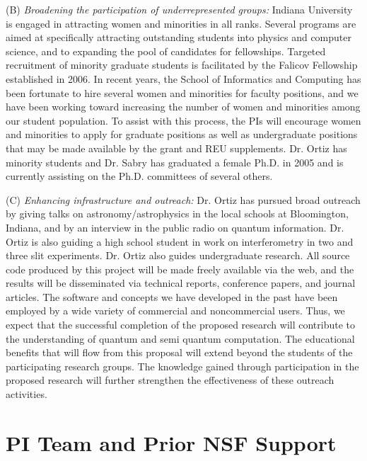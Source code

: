\documentclass{article}
\theoremstyle{remark}
\begin{document}
\medskip
\noindent (B) {\em Broadening the participation of underrepresented groups:}
Indiana University is engaged in attracting women and minorities in all
ranks. Several programs are aimed at specifically attracting outstanding
students into physics and computer science, and to expanding the pool of
candidates for fellowships. Targeted recruitment of minority graduate
students is facilitated by the Falicov Fellowship established in 2006. In
recent years, the School of Informatics and Computing has been fortunate to
hire several women and minorities for faculty positions, and we have been
working toward increasing the number of women and minorities among our
student population. To assist with this process, the PIs will encourage women
and minorities to apply for graduate positions as well as undergraduate
positions that may be made available by the grant and REU
supplements. Dr. Ortiz has minority students and Dr. Sabry has graduated a
female Ph.D. in 2005 and is currently assisting on the Ph.D. committees of
several others. 

\medskip
\noindent (C) {\em Enhancing infrastructure and outreach:} Dr. Ortiz
has pursued broad outreach by giving talks on astronomy/astrophysics
in the local schools at Bloomington, Indiana, and by an interview in
the public radio on quantum information. Dr. Ortiz is also guiding a
high school student in work on interferometry in two and three slit
experiments. Dr. Ortiz also guides undergraduate research. All source
code produced by this project will be made freely available via the
web, and the results will be disseminated via technical reports,
conference papers, and journal articles.  The software and concepts we
have developed in the past have been employed by a wide variety of
commercial and noncommercial users.  Thus, we expect that the
successful completion of the proposed research will contribute to the
understanding of quantum and semi quantum computation. The educational
benefits that will flow from this proposal will extend beyond the
students of the participating research groups. The knowledge gained
through participation in the proposed research will further strengthen
the effectiveness of these outreach activities.

\section{PI Team and Prior NSF Support} 
\end{document}
